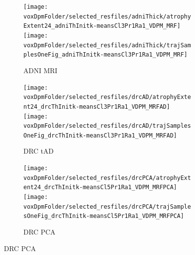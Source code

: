 \begin{figure}
  \centering
  \vspace{-1em}

  \begin{subfigure}[b]{0.45\textwidth}
   \centering
  \vspace{1em}
  \end{subfigure}
  
  

  \begin{subfigure}[b]{\textwidth}
   \centering
  \texttt{[image: \\voxDpmFolder/selected\_resfiles/adniThick/atrophyExtent24\_adniThInitk-meansCl3Pr1Ra1\_VDPM\_MRF]} \texttt{[image: \\voxDpmFolder/selected\_resfiles/adniThick/trajSamplesOneFig\_adniThInitk-meansCl3Pr1Ra1\_VDPM\_MRF]}
    \caption{ADNI MRI}
    \label{diveClustAdniMri}
  \end{subfigure}

  \begin{subfigure}[b]{\textwidth}
   \centering
  \texttt{[image: \\voxDpmFolder/selected\_resfiles/drcAD/atrophyExtent24\_drcThInitk-meansCl3Pr1Ra1\_VDPM\_MRFAD]} \texttt{[image: \\voxDpmFolder/selected\_resfiles/drcAD/trajSamplesOneFig\_drcThInitk-meansCl3Pr1Ra1\_VDPM\_MRFAD]}
    \caption{DRC tAD}
    \label{diveClustDrcAd}
  \end{subfigure}
  
  \begin{subfigure}[b]{\textwidth}
   \centering
  \texttt{[image: \\voxDpmFolder/selected\_resfiles/drcPCA/atrophyExtent24\_drcThInitk-meansCl5Pr1Ra1\_VDPM\_MRFPCA]} \texttt{[image: \\voxDpmFolder/selected\_resfiles/drcPCA/trajSamplesOneFig\_drcThInitk-meansCl5Pr1Ra1\_VDPM\_MRFPCA]}
    \caption{DRC PCA}
    \label{diveClustDrcPca}
  \end{subfigure}
  

\end{figure}

